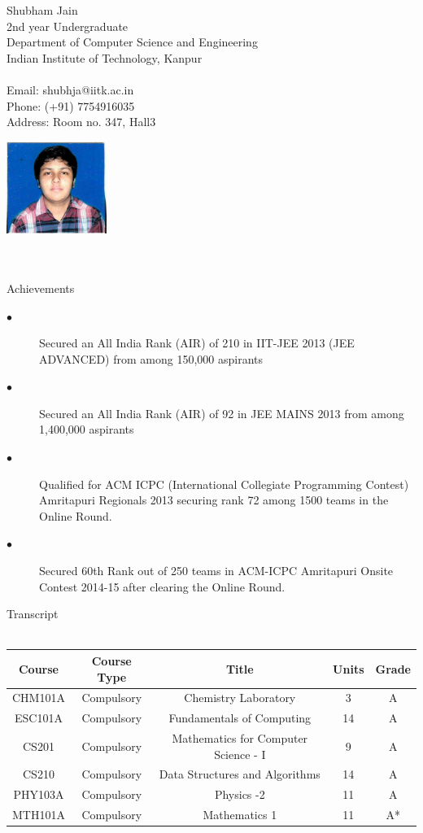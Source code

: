 \documentclass{article}
\begin{document}
\begin{minipage}{0.45\textwidth}
{\Large Shubham Jain}
\\ 2nd year Undergraduate
\\ Department of Computer Science and Engineering 
\\ Indian Institute of Technology, Kanpur
\\
\\ Email: shubhja@iitk.ac.in
\\  Phone: (+91) 7754916035
\\  Address: Room no. 347, Hall3
\end{minipage}
\begin{minipage}{0.45\textwidth}
\hfill{\includegraphics[height=3cm]{Photo}}
\end{minipage}
\\ \vspace{5 mm}
\\  
{\large Achievements}
\begin{description}
 \item[$\bullet $] Secured an All India Rank (AIR) of 210 in IIT-JEE 2013 (JEE ADVANCED) from among 150,000 aspirants
 \item[$\bullet $] Secured an All India Rank (AIR) of 92 in JEE MAINS 2013 from among 1,400,000 aspirants
 \item[$\bullet $] Qualified for ACM ICPC (International Collegiate Programming Contest) Amritapuri Regionals 2013 securing rank 72 among 1500 teams in the Online Round.
 \item[$\bullet $] Secured 60th Rank out of 250 teams in ACM-ICPC Amritapuri Onsite Contest 2014-15 after clearing the Online Round.
\end{description}
\vspace{5 mm}
{\large Transcript}
\\ \\ \vspace{10 mm}
\begin{tabular}{ | c | c | c | c | c |}\hline
Course & Course Type & Title & Units & Grade \\\hline
CHM101A & Compulsory & Chemistry Laboratory & 3 & A\\\hline
ESC101A & Compulsory & Fundamentals of Computing & 14 & A\\\hline
CS201 & Compulsory & Mathematics for Computer Science - I & 9 & A\\\hline
CS210 & Compulsory & Data Structures and Algorithms  & 14 & A\\\hline
PHY103A & Compulsory & Physics -2 & 11 & A \\\hline
MTH101A & Compulsory & Mathematics 1 & 11 & A*\\\hline
\end{tabular}
\end{document}
